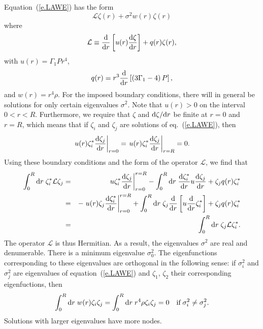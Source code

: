 Equation~(\ref{e.LAWE}) has the form
\[
\mathcal{L}\zeta(r) + \sigma^{2} w(r) \zeta(r)
\]
where
\[
\mathcal{L} \equiv \frac{\mathrm{d}}{\mathrm{d} r}\left[ u(r) \frac{\mathrm{d} \zeta}{\mathrm{d} r}\right] + q(r)\zeta(r),
\]
with $u(r) = \Gamma_{1} P r^{4}$,
\[ q(r) = r^{3}\frac{\mathrm{d}}{\mathrm{d} r}\left[\left( 3\Gamma_{1}-4\right)P\right], \]
and $w(r) = r^{4}\rho$.  For the imposed boundary conditions, there will in general be solutions for only certain eigenvalues $\sigma^{2}$.  Note that $u(r) > 0$ on the interval $0 < r < R$.  Furthermore, we require that $\zeta$ and $\mathrm{d} \zeta/\mathrm{d} r$ be finite at $r = 0$ and $r = R$, which means that if $\zeta_{i}$ and $\zeta_{j}$ are solutions of eq.~(\ref{e.LAWE}), then
\begin{equation}\label{e.LAWE-boundary}
\left . u(r) \zeta_{i}^{*}\frac{\mathrm{d}\zeta_{j}}{\mathrm{d} r} \right |_{r = 0} = \left . u(r) \zeta_{i}^{*}\frac{\mathrm{d}\zeta_{j}}{\mathrm{d} r} \right |_{r = R} = 0.
\end{equation}
Using these boundary conditions and the form of the operator $\mathcal{L}$, we find that
\begin{eqnarray*}
 \int_{0}^{R}\mathrm{d} r\; \zeta_{i}^{*} \mathcal{L}\zeta_{j} &=&  \left. u\zeta_{i}^{*}\frac{\mathrm{d}\zeta_{j}}{\mathrm{d} r}\right|_{r=0}^{r=R} -  \int_{0}^{R}\mathrm{d} r\; \frac{\mathrm{d}\zeta_{i}^{*}}{\mathrm{d} r} u \frac{\mathrm{d}\zeta_{j}}{\mathrm{d} r} + \zeta_{j}q(r)\zeta_{i}^{*}\\
  &=& -\left. u(r) \zeta_{j}\frac{\mathrm{d}\zeta_{i}^{*}}{\mathrm{d} r} \right|_{r=0}^{r=R} + \int_{0}^{R}\mathrm{d} r\; \zeta_{j}\frac{\mathrm{d}}{\mathrm{d} r}\left[u\frac{\mathrm{d}}{\mathrm{d} r}\zeta_{i}^{*}\right] + \zeta_{j}q(r)\zeta_{i}^{*} \\
   &=& \int_{0}^{R}\mathrm{d} r\; \zeta_{j}\mathcal{L}\zeta_{i}^{*}.
 \end{eqnarray*}
The operator $\mathcal{L}$ is thus Hermitian.  As a result, the eigenvalues $\sigma^{2}$ are real and denumerable.  There is a minimum eigenvalue $\sigma^{2}_{0}$.  The eigenfunctions corresponding to these eigenvalues are orthogonal in the following sense: if $\sigma^{2}_{i}$ and $\sigma_{j}^{2}$ are eigenvalues of equation~(\ref{e.LAWE}) and $\zeta_{1}$, $\zeta_{2}$ their corresponding eigenfuctions, then
\begin{equation}\label{e.LAWE-orthogonality}
\int_{0}^{R}\mathrm{d} r\; w(r) \zeta_{i}\zeta_{j} = \int_{0}^{R} \mathrm{d} r\; r^{4}\rho \zeta_{i}\zeta_{j} = 0\quad \textrm{if} \;\sigma_{i}^{2} \neq \sigma_{j}^{2}.
\end{equation}
Solutions with larger eigenvalues have more nodes.
